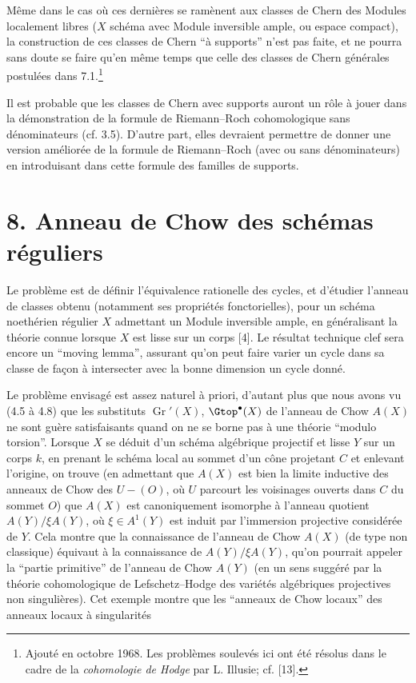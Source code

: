 Même
dans le cas où ces dernières se ramènent aux classes de Chern des Modules localement libres ($X$ schéma avec Module inversible ample, ou espace compact), la construction de ces classes de Chern ``à supports'' n'est pas faite, et ne pourra sans doute se faire qu'en même temps que celle des classes de Chern générales postulées dans 7.1.\footnote{Ajouté en octobre 1968. Les problèmes soulevés ici ont été résolus dans le cadre de la \emph{cohomologie de Hodge} par L. Illusie; cf. [13].}

Il est probable que les classes de Chern avec supports auront un rôle à jouer dans la démonstration de la formule de Riemann--Roch cohomologique sans dénominateurs (cf. 3.5). D'autre part, elles devraient permettre de donner une version améliorée de la formule de Riemann--Roch (avec ou sans dénominateurs) en introduisant dans cette formule des familles de supports.

\section*{8. Anneau de Chow des schémas réguliers}

Le problème est de définir l'équivalence rationelle des cycles, et d'étudier l'anneau de classes obtenu (notamment ses propriétés fonctorielles), pour un schéma noethérien régulier $X$ admettant un Module inversible ample, en généralisant la théorie connue lorsque $X$ est lisse sur un corps [4]. Le résultat technique clef sera encore un ``moving lemma'', assurant qu'on peut faire varier un cycle dans sa classe de façon à intersecter avec la bonne dimension un cycle donné.

Le problème envisagé est assez naturel à priori, d'autant plus que nous avons vu (4.5 à 4.8) que les substituts $\operatorname{Gr}'(X)$, $\Gtop^\bullet(X)$ de l'anneau de Chow $A(X)$ ne sont guère satisfaisants quand on ne se borne pas à une théorie ``modulo torsion''. Lorsque $X$ se déduit d'un schéma algébrique projectif et lisse $Y$ sur un corps $k$, en prenant le schéma local au sommet d'un cône projetant $C$ et enlevant l'origine, on trouve (en admettant que $A(X)$ est bien la limite inductive des anneaux de Chow des $U-(O)$, où $U$ parcourt les voisinages ouverts dans $C$ du sommet $O$) que $A(X)$ est canoniquement isomorphe à l'anneau quotient $A(Y)/\xi A(Y)$, où $\xi\in A^1(Y)$ est induit par l'immersion projective considérée de $Y$. Cela montre que la connaissance de l'anneau de Chow $A(X)$ (de type non classique) équivaut à la connaissance de $A(Y)/\xi A(Y)$, qu'on pourrait appeler la ``partie primitive'' de l'anneau de Chow $A(Y)$ (en un sens suggéré par la théorie cohomologique de Lefschetz--Hodge des variétés algébriques projectives non singulières). Cet exemple montre que les ``anneaux de Chow locaux'' des anneaux locaux à singularités
